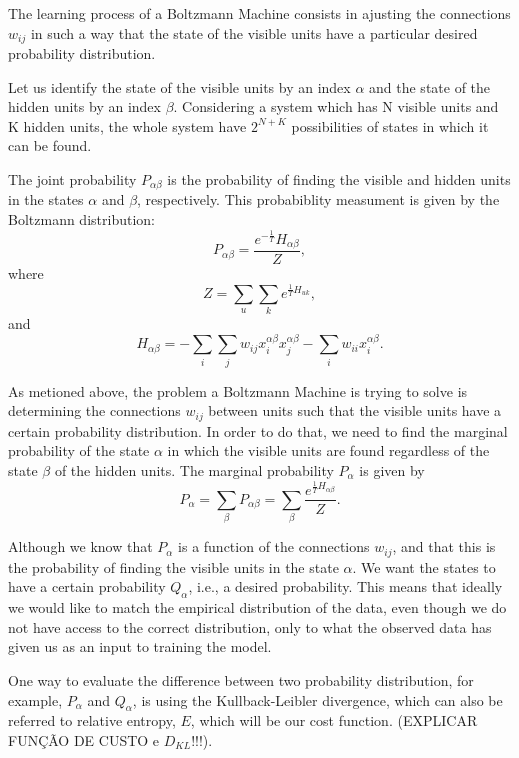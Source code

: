 The learning process of a Boltzmann Machine consists in ajusting the connections $w_{ij}$ in such a way that the state of the visible units have a particular desired probability distribution.

Let us identify the state of the visible units by an index $\alpha$ and the state of the hidden units by an index $\beta$. 
Considering a system which has N visible units and K hidden units, the whole system have $2^{N + K}$ possibilities of states in which it can be found.

The joint probability $P_{\alpha \beta}$ is the probability of finding the visible and hidden units in the states $\alpha$ and $\beta$, respectively. 
This probabiblity measument is given by the Boltzmann distribution:
\begin{equation}
  P_{\alpha \beta} = \frac{e^{-\frac{1}{T}}H_{\alpha \beta}}{Z},
  \label{eq:eq8}
\end{equation}
where
\begin{equation}
  Z = \sum_{u} \sum_{k} e^{\frac{1}{T}H_{u k}},
  \label{eq:eq9}
\end{equation}
and
\begin{equation}
  H_{\alpha \beta} = - \sum_{i} \sum_{j} w_{ij} x^{\alpha \beta}_{i} x^{\alpha \beta}_{j} - \sum_{i} w_{ii} x^{\alpha \beta}_{i}.
  \label{eq:eq10}
\end{equation}

As metioned above, the problem a Boltzmann Machine is trying to solve is determining the connections $w_{ij}$ between units such that the visible units have a certain probability distribution. 
In order to do that, we need to find the marginal probability of the state $\alpha$ in which the visible units are found regardless of the state $\beta$ of the hidden units. The marginal probability $P_{\alpha}$ is given by
\begin{equation}
  P_{\alpha} = \sum_{\beta} P_{\alpha \beta} = \sum_{\beta} \frac{e^{\frac{1}{T} H_{\alpha \beta}}}{Z}.
  \label{eq:eq11}
\end{equation}

Although we know that $P_{\alpha}$ is a function of the connections $w_{ij}$, and that this is the probability of finding the visible units in the state $\alpha$. We want the states to have a certain probability $Q_{\alpha}$, i.e., a desired probability. 
This means that ideally we would like to match the empirical distribution of the data, even though we do not have access to the correct distribution, only to what the observed data has given us as an input to training the model.

One way to evaluate the difference between two probability distribution, for example, $P_{\alpha}$ and $Q_{\alpha}$, is using the Kullback-Leibler divergence, which can also be referred to relative entropy, $E$, which will be our cost function. 
(EXPLICAR FUN\c{C}\~{A}O DE CUSTO e $D_{KL}$!!!).
